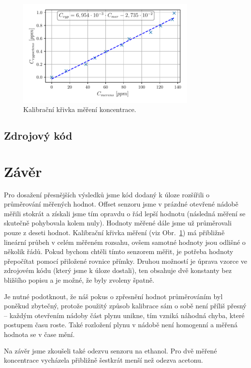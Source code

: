 \documentclass{protokol}
\begin{document}
    \begin{figure}[h!]
        \centering
        \includegraphics[width=0.8\textwidth]{img/konc-kalib.pdf}
        \caption{Kalibrační křivka měření koncentrace.}
        \label{fig:img/graf-2}
    \end{figure}


    \clearpage
    \subsection{Zdrojový kód}
    

        \clearpage
        \section*{Závěr}
            Pro dosažení přesnějších výsledků jsme kód dodaný k úloze rozšířili o průměrování měřených hodnot. Offset senzoru jsme v prázdné otevřené nádobě měřili stokrát a získali  jsme tím opravdu o řád lepší hodnotu (následná měření se skutečně pohybovala kolem nuly). Hodnoty měřené dále jsme už průměrovali pouze z deseti hodnot. Kalibrační křivka měření (viz Obr.~\ref{fig:img/graf-2}) má přibližně lineární průbeh v celém měřeném rozsahu, ovšem samotné hodnoty jsou odlišné o několik řádů. Pokud bychom chtěli tímto senzorem měřit, je potřeba hodnoty přepočítat pomocí přiložené rovnice přímky. Druhou možností je úprava vzorce ve zdrojovém kódu (který jsme k úloze dostali), ten obsahuje dvě konstanty bez bližšího popisu a je možné, že byly zvoleny špatně.

            Je nutné podotknout, že náš pokus o zpřesnění hodnot průměrováním byl poněkud zbytečný, protože použitý způsob kalibrace sám o sobě není příliš přesný -- každým otevřením nádoby část plynu unikne, tím vzniká náhodná chyba, které postupem času roste. Také rozložení plynu v nádobě není homogenní a měřená hodnota se v čase mění. 

            Na závěr jsme zkoušeli také odezvu senzoru na ethanol. Pro dvě měřené koncentrace vycházela přibližně šestkrát menší než odezva acetonu.
\end{document}

